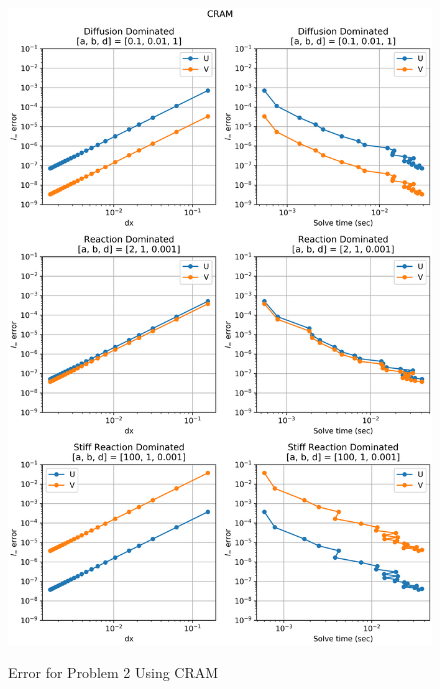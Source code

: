 \begin{figure}[t]
  \centering
  \includegraphics[width=5.75in]{images/CRAMproblem2.png}\\
  \caption{Error for Problem 2 Using CRAM}
  \label{fig:errorProblem2CRAM}
\end{figure} 


